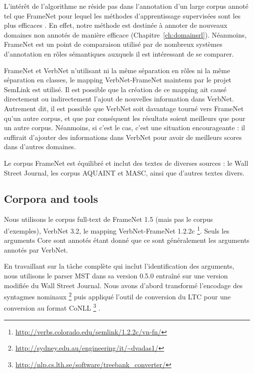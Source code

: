 L'intérêt de l'algorithme ne réside pas dans l'annotation d'un large corpus
annoté tel que FrameNet pour lequel les méthodes d'apprentissage supervisées
sont les plus efficaces \citep{das2014frame}. En effet, notre méthode est
destinée à annoter de nouveaux domaines non annotés de manière efficace
(Chapitre~\ref{ch:domainsrl}). Néanmoins, FrameNet est un point de comparaison
utilisé par de nombreux systèmes d'annotation en rôles sémantiques auxquels il
est intéressant de se comparer.

FrameNet et VerbNet n'utilisant ni la même séparation en rôles ni la même
séparation en classes, le mapping VerbNet-FrameNet maintenu par le projet
SemLink est utilisé. Il est possible que la création de ce mapping ait causé
directement ou indirectement l'ajout de nouvelles information dans VerbNet.
Autrement dit, il est possible que VerbNet soit davantage tourné vers FrameNet
qu'un autre corpus, et que par conséquent les résultats soient meilleurs que
pour un autre corpus. Néanmoins, si c'est le cas, c'est une situation
encourageante : il suffirait d'ajouter des informations dans VerbNet pour avoir
de meilleurs scores dans d'autres domaines.

Le corpus FrameNet est équilibré et inclut des textes de diverses sources : le
Wall Street Journal, les corpus AQUAINT et MASC, ainsi que d'autres textes
divers.

\subsection{Corpora and tools}
\label{subsec:corpora_tools}

Nous utilisons le corpus full-text de FrameNet 1.5 (mais pas le corpus
d'exemples), VerbNet 3.2, le mapping VerbNet-FrameNet 1.2.2c
\footnote{\url{http://verbs.colorado.edu/semlink/1.2.2c/vn-fn/}}. Seuls les
arguments Core sont annotés étant donné que ce sont généralement les arguments
annotés par VerbNet.

En travaillant sur la tâche complète qui inclut l'identification des arguments,
nous utilisons le parser MST dans sa version 0.5.0
\citep{mcdonald2006multilingual} entraîné sur une version modifiée du Wall
Street Journal. Nous avons d'abord transformé l'encodage des syntagmes nominaux
\footnote{\url{http://sydney.edu.au/engineering/it/~dvadas1/}}
\citep{vadas2007adding} puis appliqué l'outil de conversion du LTC pour une
conversion au format CoNLL
\footnote{\url{http://nlp.cs.lth.se/software/treebank_converter/}}
\citep{johansson2007extended}.

